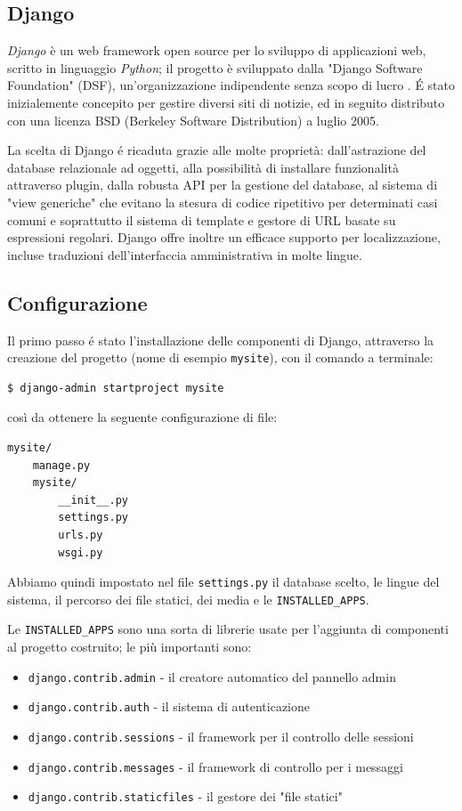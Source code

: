 \subsection{Django}
\label{django}
\emph{Django} è un web framework open source per lo sviluppo di applicazioni web, scritto in linguaggio \emph{Python}; il progetto è sviluppato dalla "Django Software Foundation" (DSF), un'organizzazione indipendente senza scopo di lucro \cite{django}. É stato inizialemente concepito per gestire diversi siti di notizie, ed in seguito distributo con una licenza BSD (Berkeley Software Distribution) a luglio 2005.

La scelta di Django é ricaduta grazie alle molte proprietà: dall'astrazione del database relazionale ad oggetti, alla
possibilità di installare funzionalità attraverso plugin, dalla robusta API per la gestione del database, al sistema di "view generiche" che evitano la stesura di codice ripetitivo per determinati casi comuni e soprattutto il sistema di template  e gestore di URL basate su espressioni regolari. Django offre inoltre un efficace supporto per localizzazione, incluse traduzioni dell'interfaccia amministrativa in molte lingue.

\subsection{Configurazione}
Il primo passo é stato l'installazione delle componenti di Django, attraverso la creazione del progetto (nome di esempio \texttt{mysite}), con il comando a terminale:
\begin{verbatim}
$ django-admin startproject mysite
\end{verbatim}

così da ottenere la seguente configurazione di file:
\begin{small}
\begin{verbatim}
mysite/
    manage.py
    mysite/
        __init__.py
        settings.py
        urls.py
        wsgi.py
\end{verbatim}
\end{small}

Abbiamo quindi impostato nel file \texttt{settings.py} il database scelto, le lingue del sistema, il percorso dei file statici, dei media e le \texttt{INSTALLED\_APPS}.

Le \texttt{INSTALLED\_APPS} sono una sorta di librerie usate per l'aggiunta di componenti al progetto costruito; le più importanti sono:
\begin{itemize}
 \item \texttt{django.contrib.admin} - il creatore automatico del pannello admin
 \item \texttt{django.contrib.auth} - il sistema di autenticazione
 \item \texttt{django.contrib.sessions} - il framework per il controllo delle sessioni
 \item \texttt{django.contrib.messages} - il framework di controllo per i messaggi
 \item \texttt{django.contrib.staticfiles} - il gestore dei "file statici"
\end{itemize}

